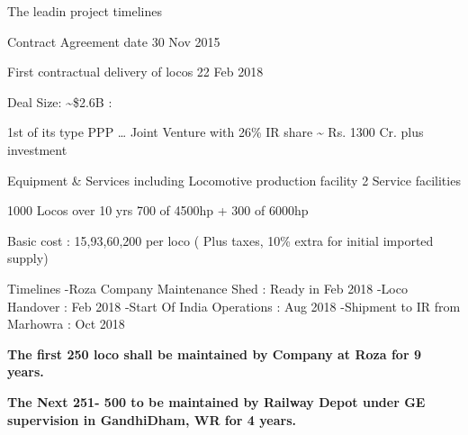 \documentclass[
  ignorenonframetext,
]{beamer}
\begin{document}
\begin{frame}{The leadin project timelines}
\protect\hypertarget{the-leadin-project-timelines}{}
\begin{block}{Contract Agreement date 30 Nov 2015}
\protect\hypertarget{contract-agreement-date-30-nov-2015}{}
\end{block}

\begin{block}{First contractual delivery of locos 22 Feb 2018}
\protect\hypertarget{first-contractual-delivery-of-locos-22-feb-2018}{}
\end{block}

\begin{block}{Deal Size: \textasciitilde\$2.6B :}
\protect\hypertarget{deal-size-2.6b}{}
\end{block}

\begin{block}{1st of its type PPP \ldots{} Joint Venture with 26\% IR
share \textasciitilde{} Rs. 1300 Cr. plus investment}
\protect\hypertarget{st-of-its-type-ppp-joint-venture-with-26-ir-share-rs.-1300-cr.-plus-investment}{}
\end{block}

\begin{block}{Equipment \& Services including Locomotive production
facility 2 Service facilities}
\protect\hypertarget{equipment-services-including-locomotive-production-facility-2-service-facilities}{}
\end{block}

\begin{block}{1000 Locos over 10 yrs 700 of 4500hp + 300 of 6000hp}
\protect\hypertarget{locos-over-10-yrs-700-of-4500hp-300-of-6000hp}{}
\end{block}

\begin{block}{Basic cost : 15,93,60,200 per loco ( Plus taxes, 10\%
extra for initial imported supply)}
\protect\hypertarget{basic-cost-159360200-per-loco-plus-taxes-10-extra-for-initial-imported-supply}{}
\end{block}
\end{frame}

\begin{frame}{Timelines}
\protect\hypertarget{timelines}{}
-Roza Company Maintenance Shed : Ready in Feb 2018 -Loco Handover : Feb
2018 -Start Of India Operations : Aug 2018 -Shipment to IR from Marhowra
: Oct 2018

\textbf{The first 250 loco shall be maintained by Company at Roza for 9
years.}

\textbf{The Next 251- 500 to be maintained by Railway Depot under GE
supervision in GandhiDham, WR for 4 years.}
\end{frame}
\end{document}
